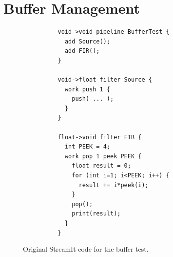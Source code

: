 \documentclass{sigplanconf}
\begin{document}





\section{Buffer Management}
\label{sec:buffer}

\begin{figure}[t]

\centering
{\small
\begin{verbatim}
          void->void pipeline BufferTest {
            add Source();                 
            add FIR();                    
          }                               
                                          
          void->float filter Source {     
            work push 1 {                 
              push( ... );             
            } 
          }                               
                                          
          float->void filter FIR {        
            int PEEK = 4;                 
            work pop 1 peek PEEK {        
              float result = 0;           
              for (int i=1; i<PEEK; i++) {
                result += i*peek(i);      
              }                           
              pop();                      
              print(result);              
            }                             
          }                               
\end{verbatim}}
\vspace{-6pt}
\caption{Original StreamIt code for the buffer test.\protect\label{fig:code-orig}}
\end{figure}
\end{document}
